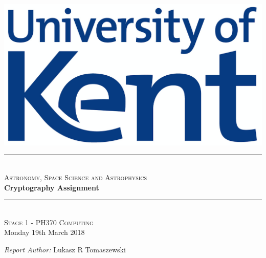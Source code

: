 \documentclass[12pt]{article}
\begin{document}
\begin{titlepage}

\newcommand{\HRule}{\rule{\linewidth}{0.5mm}}

\begin{centering} 
 

\includegraphics[scale=0.4]{Uni_of_Kent_Logo.png}\\[1cm]


\HRule \\[0.4cm]
\textsc{\large Astronomy, Space Science and Astrophysics}\\[0.4cm]
{\huge \bfseries Cryptography Assignment}\\[0.4cm]
\HRule \\[1.0cm]


\textsc{\Large Stage 1 - PH370 Computing}\\[0.5cm] 
{\large Monday 19th March 2018}\\[1.0cm]


\begin{minipage}{0.625\textwidth}
\centering

\emph{\large Report Author:} \large Lukasz R Tomaszewski \\ [0.2cm]
\end{minipage}\\[2cm]

\vfill
\end{centering} 
\end{titlepage}
\end{document}
